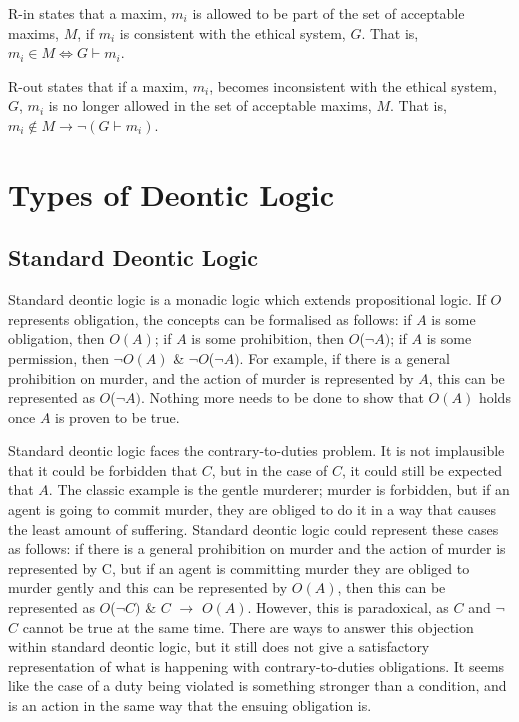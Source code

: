 \documentclass{l4proj}
\begin{document}
R-in states that a maxim, $m_i$ is allowed to be part of the set of acceptable maxims, $M$, if $m_i$ is consistent with the ethical 
system, $G$. That is, $m_i \in M \iff G \vdash m_i $. 

R-out states that if a maxim, $m_i$, becomes inconsistent with the ethical system, $G$, $m_i$ is no longer allowed in the set of acceptable maxims, $M$. That is, $m_i \notin M \rightarrow \neg(G \vdash m_i)$. 


\section{Types of Deontic Logic}

\subsection{Standard Deontic Logic}
Standard deontic logic is a monadic logic which extends propositional logic. If $O$ represents obligation, the concepts can be formalised as follows: if $A$ is some obligation, then $O(A)$; if $A$ is some prohibition, then $O$(\( \neg \)$A)$; if $A$ is some permission, then \( \neg \)$O(A)$ \& \( \neg \)$O$(\( \neg \)$A)$. For example, if there is a general prohibition on murder, and the action of murder is represented by $A$, this can be represented as $O$(\( \neg \)$A)$. Nothing more needs to be done to show that $O(A)$ holds once $A$ is proven to be true. 

Standard deontic logic faces the contrary-to-duties problem. It is not implausible that it could be forbidden that $C$, but in the case of $C$, it could still be expected that $A$. The classic example is the gentle murderer; murder is forbidden, but if an agent is going to commit murder, they are obliged to do it in a way that causes the least amount of suffering. Standard deontic logic could represent these cases as follows: if there is a general prohibition on murder and the action of murder is represented by C, but if an agent is committing murder they are obliged to murder gently and this can be represented by $O(A)$, then this can be represented as $O$(\( \neg \)$C)$ \& $C$ \( \to \) $O(A)$. However, this is paradoxical, as $C$ and \( \neg \)$C$ cannot be true at the same time. There are ways to answer this objection within standard deontic logic, but it still does not give a satisfactory representation of what is happening with contrary-to-duties obligations. It seems like the case of a duty being violated is something stronger than a condition, and is an action in the same way that the ensuing obligation is. 
\end{document}
